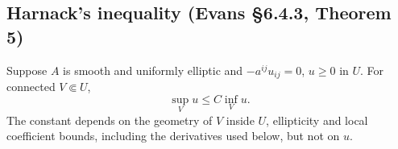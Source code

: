 \Needspace{35mm}
\subsection{Harnack's inequality (Evans \S6.4.3, Theorem 5)}
\begin{theorem}\label{thm:6-harnack}
Suppose $A$ is smooth and uniformly elliptic and
$-a^{ij}u_{ij}=0$, $u\geq0$ in $U$. For connected $V\Subset U$,
\[
 \sup_Vu\leq C\inf_Vu.
\]
The constant depends on the geometry of $V$ inside $U$, ellipticity and
local coefficient bounds, including the derivatives used below, but not on $u$.
\end{theorem}
\Needspace{45mm}
